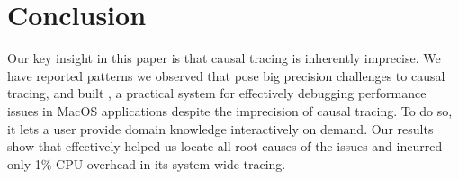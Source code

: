 \section{Conclusion}
Our key insight in this paper is that causal tracing is inherently
imprecise. We have reported patterns we observed that pose big precision
challenges to causal tracing, and built \xxx, a practical system for
effectively debugging performance issues in MacOS applications despite the
imprecision of causal tracing.  To do so, it lets a user provide domain
knowledge interactively on demand. Our results show that \xxx effectively
helped us locate all root causes of the issues and incurred only 1\% CPU
overhead in its system-wide tracing.


